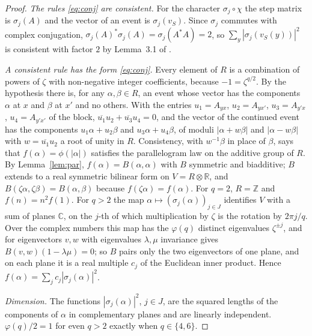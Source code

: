 \begin{proof}
\emph{The rules \eqref{eq:conj} are consistent.} For the character $\sigma_j\circ\chi$ the step matrix is $\sigma_j(A)$ and the vector of an event is $\sigma_j(v_S)$. Since $\sigma_j$ commutes with complex conjugation, $\sigma_j(A)^*\sigma_j(A)=\sigma_j(A^*A)=2$, so $\sum_y|\sigma_j(v_S(y))|^2$ is consistent with factor $2$ by Lemma~3.1 of \cite{g9}.

\emph{A consistent rule has the form \eqref{eq:conj}.} Every element of $R$ is a combination of powers of $\zeta$ with non-negative integer coefficients, because $-1=\zeta^{q/2}$. By the hypothesis there is, for any $\alpha,\beta\in R$, an event whose vector has the components $\alpha$ at $x$ and $\beta$ at $x'$ and no others. With the entries $u_1=A_{yx}$, $u_2=A_{yx'}$, $u_3=A_{y'x}$, $u_4=A_{y'x'}$ of the block, $\overline{u_1}u_2+\overline{u_3}u_4=0$, and the vector of the continued event has the components $u_1\alpha+u_2\beta$ and $u_3\alpha+u_4\beta$, of moduli $|\alpha+w\beta|$ and $|\alpha-w\beta|$ with $w=\overline{u_1}u_2$ a root of unity in $R$. Consistency, with $w^{-1}\beta$ in place of $\beta$, says that $f(\alpha)=\phi(|\alpha|)$ satisfies the parallelogram law on the additive group of $R$. By Lemma~\ref{lem:par}, $f(\alpha)=B(\alpha,\alpha)$ with $B$ symmetric and biadditive; $B$ extends to a real symmetric bilinear form on $V=R\otimes\mathbb{R}$, and $B(\zeta\alpha,\zeta\beta)=B(\alpha,\beta)$ because $f(\zeta\alpha)=f(\alpha)$. For $q=2$, $R=\mathbb{Z}$ and $f(n)=n^2f(1)$. For $q>2$ the map $\alpha\mapsto(\sigma_j(\alpha))_{j\in J}$ identifies $V$ with a sum of planes $\mathbb{C}$, on the $j$-th of which multiplication by $\zeta$ is the rotation by $2\pi j/q$. Over the complex numbers this map has the $\varphi(q)$ distinct eigenvalues $\zeta^{\pm j}$, and for eigenvectors $v,w$ with eigenvalues $\lambda,\mu$ invariance gives $B(v,w)(1-\lambda\mu)=0$; so $B$ pairs only the two eigenvectors of one plane, and on each plane it is a real multiple $c_j$ of the Euclidean inner product. Hence $f(\alpha)=\sum_jc_j|\sigma_j(\alpha)|^2$.

\emph{Dimension.} The functions $|\sigma_j(\alpha)|^2$, $j\in J$, are the squared lengths of the components of $\alpha$ in complementary planes and are linearly independent. $\varphi(q)/2=1$ for even $q>2$ exactly when $q\in\{4,6\}$.
\end{proof}

